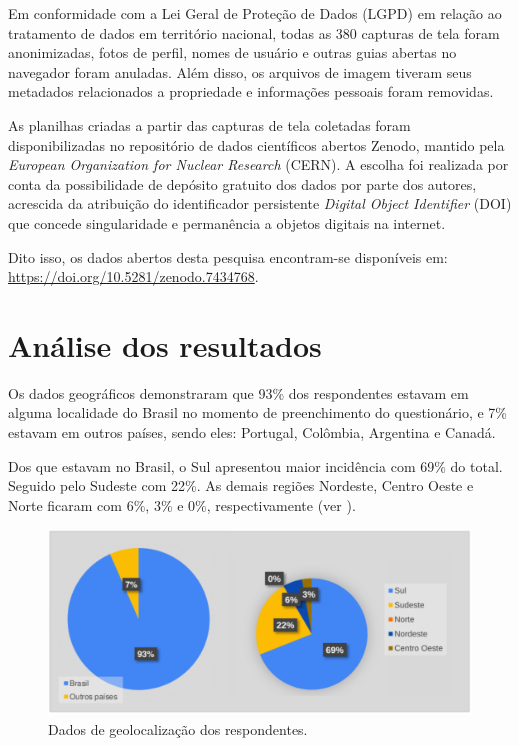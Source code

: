 \documentclass[portuguese]{textolivre}
\begin{document}
Em conformidade com a Lei Geral de Proteção de Dados (LGPD) em relação ao tratamento de dados em território nacional, todas as 380 capturas de tela foram anonimizadas, fotos de perfil, nomes de usuário e outras guias abertas no navegador foram anuladas. Além disso, os arquivos de imagem tiveram seus metadados relacionados a propriedade e informações pessoais foram removidas.

As planilhas criadas a partir das capturas de tela coletadas foram disponibilizadas no repositório de dados científicos abertos Zenodo, mantido pela \textit{European Organization for Nuclear Research} (CERN). A escolha foi realizada por conta da possibilidade de depósito gratuito dos dados por parte dos autores, acrescida da atribuição do identificador persistente \textit{Digital Object Identifier} (DOI) que concede singularidade e permanência a objetos digitais na internet.

Dito isso, os dados abertos desta pesquisa encontram-se disponíveis em: \url{https://doi.org/10.5281/zenodo.7434768}.

\section{Análise dos resultados}\label{sec-autores}
Os dados geográficos demonstraram que 93\% dos respondentes estavam em alguma localidade do Brasil no momento de preenchimento do questionário, e 7\% estavam em outros países, sendo eles: Portugal, Colômbia, Argentina e Canadá.

Dos que estavam no Brasil, o Sul apresentou maior incidência com 69\% do total. Seguido pelo Sudeste com 22\%. As demais regiões Nordeste, Centro Oeste e Norte ficaram com 6\%, 3\% e 0\%, respectivamente (ver ).

\begin{figure}[h!]
    \centering
    \includegraphics[width=0.8\linewidth]{gra-001.pdf}
    \caption{Dados de geolocalização dos respondentes.}
    \label{fig9}
\end{figure}
\end{document}
